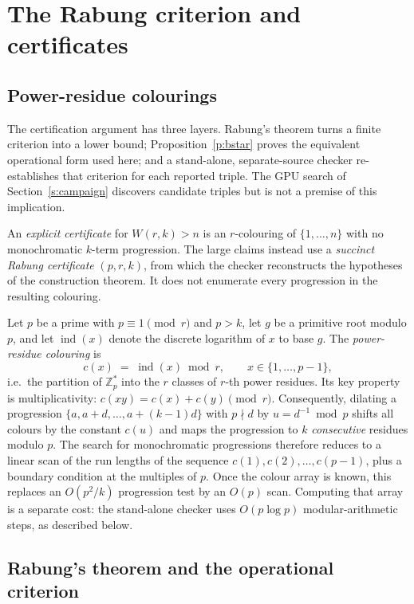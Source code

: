 \section{The Rabung criterion and certificates}\label{s:method}

\subsection{Power-residue colourings}\label{ss:prc}

The certification argument has three layers.  Rabung's theorem turns a finite
criterion into a lower bound; Proposition~\ref{p:bstar} proves the equivalent
operational form used here; and a stand-alone, separate-source checker
re-establishes that criterion for each reported triple.  The GPU search of
Section~\ref{s:campaign} discovers candidate triples but is not a premise of
this implication.

An \emph{explicit certificate} for $W(r,k)>n$ is an $r$-colouring of
$\{1,\dots,n\}$ with no monochromatic $k$-term progression.  The large claims
instead use a \emph{succinct Rabung certificate} $(p,r,k)$, from which the
checker reconstructs the hypotheses of the construction theorem.  It does not
enumerate every progression in the resulting colouring.

Let $p$ be a prime with $p\equiv 1 \pmod r$ and $p>k$, let $g$ be a primitive
root modulo $p$, and let $\operatorname{ind}(x)$ denote the discrete logarithm
of $x$ to base $g$. The \emph{power-residue colouring} is
\[
  c(x) \;=\; \operatorname{ind}(x) \bmod r , \qquad x \in \{1,\dots,p-1\},
\]
i.e.\ the partition of $\mathbb{Z}_p^{*}$ into the $r$ classes of $r$-th power
residues. Its key property is multiplicativity: $c(xy)=c(x)+c(y) \pmod r$.
Consequently, dilating a progression $\{a,a+d,\dots,a+(k-1)d\}$ with
$p \nmid d$ by $u=d^{-1} \bmod p$ shifts all colours by the constant $c(u)$ and
maps the progression to $k$ \emph{consecutive} residues modulo $p$. The search
for monochromatic progressions therefore reduces to a linear scan of the run
lengths of the sequence $c(1),c(2),\dots,c(p-1)$, plus a boundary condition at
the multiples of $p$. Once the colour array is known, this replaces an
$O(p^2/k)$ progression test by an $O(p)$ scan. Computing that array is a
separate cost: the stand-alone checker uses $O(p\log p)$ modular-arithmetic
steps, as described below.

\subsection{Rabung's theorem and the operational criterion}\label{ss:criterion}

